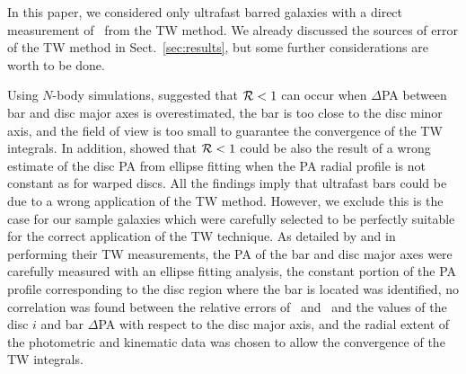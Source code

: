 \documentclass{aa}
\begin{document}
In this paper, we considered only ultrafast barred galaxies with a direct measurement of \omegabar\ from the TW method. We already discussed the sources of error of the TW method in Sect.~\ref{sec:results}, but some further considerations are worth to be done.

Using $N$-body simulations, \cite{Zou2019} suggested that ${\cal R}<1$ can occur when $\Delta$PA between bar and disc major axes is overestimated, the bar is too close to the disc minor axis, and the field of view is too small to guarantee the convergence of the TW integrals. In addition, \cite{Cuomo2019} showed that ${\cal R}<1$ could be also the result of a wrong estimate of the disc PA from ellipse fitting when the PA radial profile is not constant as for warped discs. All the findings imply that ultrafast bars could be due to a wrong application of the TW method. However, we exclude this is the case for our sample galaxies which were carefully selected to be perfectly suitable for the correct application of the TW technique. As detailed by \citet{Aguerri2015} and \citet{Cuomo2019b} in performing their TW measurements, the PA of the bar and disc major axes were carefully measured with an ellipse fitting analysis, the constant portion of the PA profile corresponding to the disc region where the bar is located was identified, no correlation was found between the relative errors of \rcor\ and \rbar\ and the values of the disc $i$ and bar $\Delta$PA with respect to the disc major axis, and the radial extent of the photometric and kinematic data was chosen to allow the convergence of the TW integrals.
\end{document}
